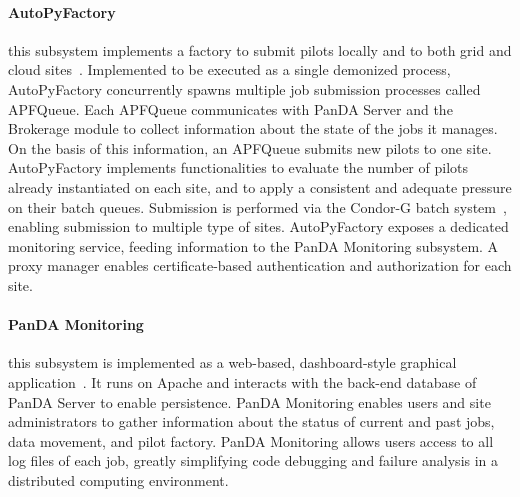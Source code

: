 \paragraph{\textbf{AutoPyFactory}} this subsystem implements a factory to submit
pilots locally and to both grid and cloud
sites~\cite{caballero2012autopyfactory}. Implemented to be executed as a single
demonized process, AutoPyFactory concurrently spawns multiple job submission
processes called APFQueue. Each APFQueue communicates with PanDA Server and the
Brokerage module to collect information about the state of the jobs it manages.
On the basis of this information, an APFQueue submits new pilots to one site.
AutoPyFactory implements functionalities to evaluate the number of pilots
already instantiated on each site, and to apply a consistent and adequate
pressure on their batch queues. Submission is performed via the Condor-G batch
system~\cite{frey2002condor}, enabling submission to multiple type of sites.
AutoPyFactory exposes a dedicated monitoring service, feeding information to the
PanDA Monitoring subsystem. A proxy manager enables certificate-based
authentication and authorization for each site.


\paragraph{\textbf{PanDA Monitoring}} this subsystem is implemented as a
web-based, dashboard-style graphical application~\cite{klimentov2011atlas}. It
runs on Apache and interacts with the back-end database of PanDA Server to
enable persistence. PanDA Monitoring enables users and site administrators to
gather information about the status of current and past jobs, data movement, and
pilot factory. PanDA Monitoring allows users access to all log files of each
job, greatly simplifying code debugging and failure analysis in a distributed
computing environment.

